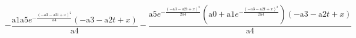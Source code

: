 \documentclass{article}
\begin{document}
\[-\frac{\text{a1} \text{a5} e^{-\frac{(-\text{a3}-\text{a2} t+x)^2}{\text{a4}}} (-\text{a3}-\text{a2} t+x)}{\text{a4}}-\frac{\text{a5} e^{-\frac{(-\text{a3}-\text{a2}
t+x)^2}{2 \text{a4}}} \left(\text{a0}+\text{a1} e^{-\frac{(-\text{a3}-\text{a2} t+x)^2}{2 \text{a4}}}\right) (-\text{a3}-\text{a2} t+x)}{\text{a4}}\]
\end{document}
